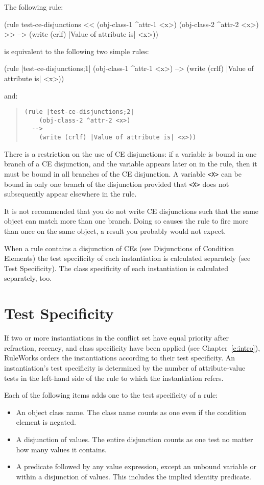 The following rule:
\begin{qv}
(rule test-ce-disjunctions
    << (obj-class-1 ^attr-1 <x>)
       (obj-class-2 ^attr-2 <x>) >>
  -->
    (write (crlf) |Value of attribute is| <x>))
\end{qv}
is equivalent to the following two simple rules:
\begin{qv}
(rule |test-ce-disjunctions;1|
    (obj-class-1 ^attr-1 <x>)
  -->
    (write (crlf) |Value of attribute is| <x>))
\end{qv}
and:
\begin{quote}
\begin{verbatim}
(rule |test-ce-disjunctions;2|
    (obj-class-2 ^attr-2 <x>)
  -->
    (write (crlf) |Value of attribute is| <x>))
\end{verbatim}
\end{quote}
There is a restriction on the use of CE disjunctions: if a variable is
bound in one branch of a CE disjunction, and the variable appears
later on in the rule, then it must be bound in all branches of the CE
disjunction. A variable \verb|<X>| can be bound in only one branch of
the disjunction provided that \verb|<X>| does not subsequently appear
elsewhere in the rule.

It is not recommended that you do not write CE disjunctions such that
the same object can match more than one branch. Doing so causes the
rule to fire more than once on the same object, a result you probably
would not expect.

When a rule contains a disjunction of CEs (see Disjunctions of
Condition Elements) the test specificity of each instantiation is
calculated separately (see Test Specificity). The class specificity of
each instantiation is calculated separately, too.

\section{Test Specificity}

If two or more instantiations in the conflict set have equal priority
after refraction, recency, and class specificity have been applied
(see Chapter~\ref{c:intro}), RuleWorks orders the instantiations
according to their test specificity. An instantiation's test
specificity is determined by the number of attribute-value tests in
the left-hand side of the rule to which the instantiation refers.

Each of the following items adds one to the test specificity of a
rule:
\begin{itemize}    
\item An object class name. The class name counts as one even if the
  condition element is negated.
\item A disjunction of values. The entire disjunction counts as one
  test no matter how many values it contains.
\item A predicate followed by any value expression, except an unbound
  variable or within a disjunction of values. This includes the
  implied identity predicate.
\end{itemize}
   
